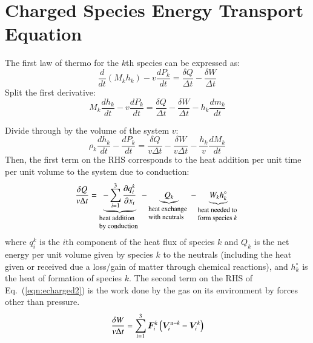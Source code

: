 \documentclass{warpdoc}
\renewcommand{\vec}[1]{\bm{#1}}
\begin{document}
\section{Charged Species Energy Transport Equation}


The first law of thermo for the $k$th species can be expressed as:
%
\begin{equation}
 \frac{d }{d t}\left(M_k h_k\right) - v \frac{d P_k}{dt} = \frac{\delta Q}{\Delta t}-\frac{\delta W}{\Delta t}
\end{equation}
%
Split the first derivative:
%
\begin{equation}
 M_k\frac{d h_k}{d t} - v \frac{d P_k}{dt} = \frac{\delta Q}{\Delta t}-\frac{\delta W}{\Delta t}-h_k\frac{d m_k}{d t}
\end{equation}
%
  
Divide through by the volume of the system $v$:
%
\begin{equation}
\rho_k \frac{d h_k}{d t} -  \frac{d P_k}{dt} = \frac{\delta Q}{v \Delta t}-\frac{\delta W}{v \Delta t}
-\frac{h_k}{v}\frac{d M_k}{d t}
\label{eqn:echarged2}
\end{equation}
%  
Then, the first term on the RHS corresponds to the heat addition per unit time per unit volume to the system due to conduction:
%
\begin{equation}
\frac{\delta Q}{v \Delta t}= 
\underbrace{
  -\sum_{i=1}^{3}\frac{\partial q_i^k}{\partial x_i}
}_{\begin{minipage}{1.7cm}\flushleft \footnotesize heat addition by conduction\end{minipage}}
-
\underbrace{
Q_k
}_{\begin{minipage}{1.7cm}\flushleft \footnotesize heat exchange with neutrals\end{minipage}}
-
\underbrace{
W_k h_k^\circ
}_{\begin{minipage}{1.7cm}\flushleft \footnotesize heat needed to form species $k$ \end{minipage}}
\end{equation}
%
where $q^k_i$ is the $i$th component of the heat flux of species $k$ and $Q_{k}$ is the net energy per unit volume given by species $k$ to the neutrals (including the heat given or received due a loss/gain of matter through chemical reactions), and $h_k^\circ$ is the heat of formation of species $k$. The second term on the RHS of Eq.\ (\ref{eqn:echarged2}) is the work done by the gas on its environment by forces other than pressure. 
%
\begin{equation}
\frac{\delta W}{v \Delta t}= \sum_{i=1}^3 \vec{F}_i^k \left( \vec{V}_i^{{\rm n}-k}-\vec{V}_i^k \right)
\end{equation}
\end{document}
